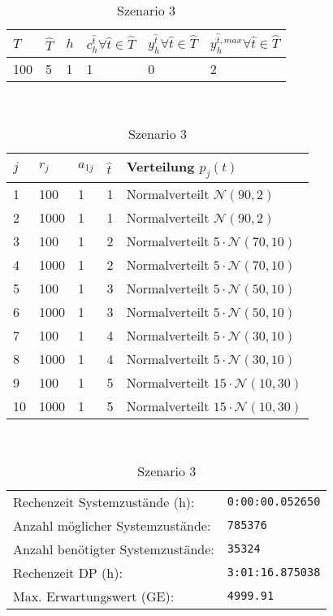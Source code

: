 \begin{table}[h!]
\renewcommand{\arraystretch}{1.5}
  \begin{center}
    \caption{Szenario 3}  \label{S3}
    \vspace*{3mm}
    \begin{tabular}{l l l l l l}   %
    $T$ & $\hat T$  & $h$ & $c_h^{\hat t}\forall \hat{t}\in{\hat T}$ & $y_h^{\hat t}\forall \hat{t}\in{\hat T}$  & $y_h^{{\hat t},max}\forall \hat{t}\in{\hat T}$  \\  \hline
100 & 5 & 1 & 1 & 0 & 2  \\ \hline
    \end{tabular} \\[3mm]
        \begin{tabular}{p{1cm} p{1cm} p{1cm}  p{1cm} p{6cm}}   %
    $j$ & $r_j$  & $a_{1j}$ & $\hat t$ & Verteilung $p_j(t)$ \\  \hline
1 & 100 & 1 & 1 & Normalverteilt $\mathcal{N}(90, 2)$   \\
2 & 1000 & 1 & 1 & Normalverteilt $\mathcal{N}(90, 2)$  \\
3 & 100 & 1 & 2 & Normalverteilt $5\cdot\mathcal{N}(70, 10)$  \\
4 & 1000 & 1 & 2 & Normalverteilt $5\cdot\mathcal{N}(70, 10)$  \\
5 & 100 & 1 & 3 & Normalverteilt $5\cdot\mathcal{N}(50, 10)$ \\
6 & 1000 & 1 & 3 & Normalverteilt $5\cdot\mathcal{N}(50, 10)$ \\
7 & 100 & 1 & 4 & Normalverteilt $5\cdot\mathcal{N}(30, 10)$  \\
8 & 1000 & 1 & 4 & Normalverteilt $5\cdot\mathcal{N}(30, 10)$  \\
9 & 100 & 1 & 5 & Normalverteilt $15\cdot\mathcal{N}(10, 30)$  \\
10 & 1000 & 1 & 5 & Normalverteilt $15\cdot\mathcal{N}(10, 30)$  \\ \hline
    \end{tabular} \\[3mm]
     \begin{tabular}{p{7cm}p{5cm}} \hline
     Rechenzeit Systemzustände (h): & \texttt{0:00:00.052650} \\
     Anzahl möglicher Systemzustände: & \texttt{785376} \\
     Anzahl benötigter Systemzustände: & \texttt{35324} \\ 
     Rechenzeit DP (h): & \texttt{3:01:16.875038} \\ 
          Max. Erwartungswert (GE): & \texttt{4999.91} \\ \hline
         \end{tabular} \\[3mm]
  \end{center}
\end{table}


